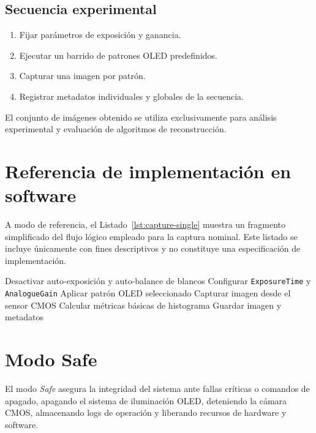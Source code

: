 \subsection*{Secuencia experimental}

\begin{enumerate}
    \item Fijar parámetros de exposición y ganancia.
    \item Ejecutar un barrido de patrones OLED predefinidos.
    \item Capturar una imagen por patrón.
    \item Registrar metadatos individuales y globales de la secuencia.
\end{enumerate}

El conjunto de imágenes obtenido se utiliza exclusivamente para análisis
experimental y evaluación de algoritmos de reconstrucción.

\section{Referencia de implementación en software}

A modo de referencia, el Listado~\ref{lst:capture-single} muestra un fragmento
simplificado del flujo lógico empleado para la captura nominal. Este listado se
incluye únicamente con fines descriptivos y no constituye una especificación de
implementación.

\begin{algorithm}[H]
\caption{Ejemplo de flujo de captura nominal}
\label{lst:capture-single}
\begin{algorithmic}[1]
\State Desactivar auto-exposición y auto-balance de blancos
\State Configurar \texttt{ExposureTime} y \texttt{AnalogueGain}
\State Aplicar patrón OLED seleccionado
\State Capturar imagen desde el sensor CMOS
\State Calcular métricas básicas de histograma
\State Guardar imagen y metadatos
\end{algorithmic}
\end{algorithm}

\section{Modo Safe}

El modo \textit{Safe} asegura la integridad del sistema ante fallas críticas o
comandos de apagado, apagando el sistema de iluminación OLED, deteniendo la
cámara CMOS, almacenando logs de operación y liberando recursos de hardware y
software.
